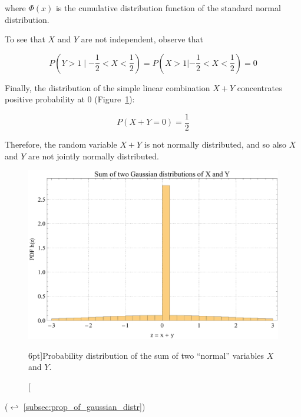 
where $\Phi(x)$ is the cumulative distribution function of the standard normal distribution.

To see that $X$ and $Y$ are not independent, observe that

$$
P(Y > 1 \mid - \frac{1}{2} < X < \frac{1}{2}) = P( X > 1 | - \frac{1}{2} < X < \frac{1}{2}) = 0
$$

Finally, the distribution of the simple linear combination $X + Y$ concentrates positive probability at 0 (Figure~\ref{fig:sum_of_Gaussian}): 

$$
P(X + Y = 0) = \frac{1}{2}
$$

Therefore, the random variable $X + Y$ is not normally distributed, and so also $X$ and $Y$ are not jointly normally distributed. 

\begin{figure}
	\includegraphics{exercise/sum_of_Gaussian.pdf}
	\caption[Probability distribution of the sum of two “normal” variables.][6pt]{Probability distribution of the sum of two “normal” variables $X$ and $Y$.}
	\label{fig:sum_of_Gaussian}
\end{figure}

($\hookleftarrow$ \ref{subsec:prop_of_gaussian_distr})
